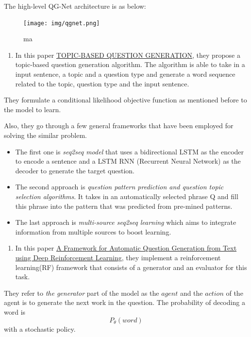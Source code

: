 \documentclass{acm_proc_article-sp}
\providecommand{\tightlist}{%
  \setlength{\itemsep}{0pt}\setlength{\parskip}{0pt}}
\begin{document}
The high-level QG-Net architecture is as below:

\begin{figure}
\centering
\texttt{[image: img/qgnet.png]}
\caption{ma}
\end{figure}

\begin{enumerate}
\def\labelenumi{\arabic{enumi}.}
\setcounter{enumi}{1}
\tightlist
\item
  In this paper
  \href{https://openreview.net/pdf?id=rk3pnae0b}{TOPIC-BASED QUESTION
  GENERATION}, they propose a topic-based question generation algorithm.
  The algorithm is able to take in a input sentence, a topic and a
  question type and generate a word sequence related to the topic,
  question type and the input sentence.
\end{enumerate}

They formulate a conditional likelihood objective function as mentioned
before to the model to learn.

Also, they go through a few general frameworks that have been employed
for solving the similar problem.

\begin{itemize}
\item
  The first one is \emph{seq2seq model} that uses a bidirectional LSTM
  as the encoder to encode a sentence and a LSTM RNN (Recurrent Neural
  Network) as the decoder to generate the target question.
\item
  The second approach is \emph{question pattern prediction and question
  topic selection algorithms}. It takes in an automatically selected
  phrase Q and fill this phrase into the pattern that was predicted from
  pre-mined patterns.
\item
  The last approach is \emph{multi-source seq2seq learning} which aims
  to integrate information from multiple sources to boost learning.
\end{itemize}

\begin{enumerate}
\def\labelenumi{\arabic{enumi}.}
\setcounter{enumi}{2}
\tightlist
\item
  In this paper \href{https://arxiv.org/pdf/1808.04961.pdf}{A Framework
  for Automatic Question Generation from Text using Deep Reinforcement
  Learning}, they implement a reinforcement learning(RF) framework that
  consists of a generator and an evaluator for this task.
\end{enumerate}

They refer to \emph{the generator} part of the model as the \(agent\)
and the \(action\) of the agent is to generate the next work in the
question. The probability of decoding a word is \[P_{\theta}(word)\]
with a stochastic policy.
\end{document}
